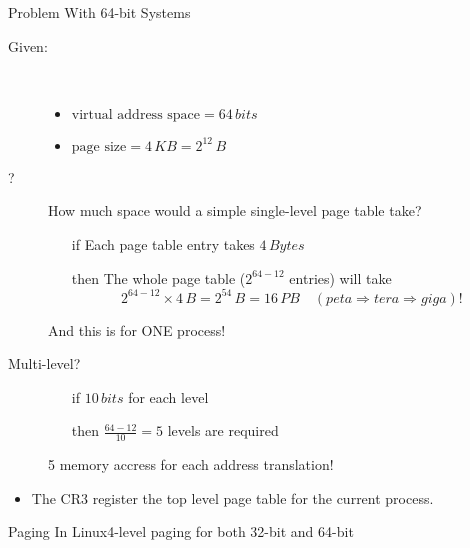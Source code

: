 \begin{frame}{Problem With 64-bit Systems}
  \begin{description}
  \item[Given:]\hfill\\[-2ex]
    \begin{itemize}
    \item $\text{virtual address space} = 64\,bits$
    \item $\text{page size}=4\,KB=2^{12}\,B$
    \end{itemize}
  \item[?] How much space would a simple single-level page table take?
    \begin{itemize}
    \item[if] Each page table entry takes $4\,Bytes$
    \item[then] The whole page table ($2^{64-12}$ entries) will take
      \[2^{64-12}\times{}4\,B=2^{54}\,B=16\,PB \quad {\scriptstyle(peta \Rightarrow tera \Rightarrow giga)!}\]
    \end{itemize}
    And this is for ONE process!
  \item[Multi-level?]\hfill
    \begin{itemize}
    \item[if] $10\,bits$ for each level
    \item[then] $\frac{64-12}{10}=5$ levels are required
    \end{itemize}
    5 memory accress for each address translation!
  \end{description}
\end{frame}

\begin{itemize}
\item The CR3 register {\pright} the top level page table for the current process.
\end{itemize}

\begin{frame}{Paging In Linux}{4-level paging for both 32-bit and 64-bit}
  \begin{center}
  \end{center}
\end{frame}

